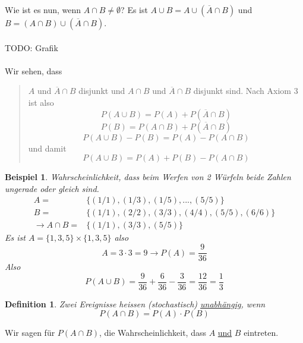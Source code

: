 \documentclass{report}
\newtheorem{mydef}{Definition}
\newtheorem{myexample}{Beispiel}
\begin{document}
Wie ist es nun, wenn $A \cap B \neq \emptyset$?
Es ist $A \cup B = A \cup (\overline{A} \cap B)$ und $B = (A \cap B) \cup (\overline{A} \cap B)$.
\\\\TODO: Grafik\\\\
Wir sehen, dass
\begin{quote}
$A$ und $\overline{A} \cap B$ disjunkt und $A \cap B$ und $\overline{A} \cap B$ disjunkt sind. Nach Axiom 3 ist also
\begin{equation}
P(A \cup B) = P(A) + P(\overline{A} \cap B)
\end{equation}
\begin{equation}
P(B) = P(A \cap B) + P(\overline{A} \cap B)
\end{equation}
\begin{equation}
P(A \cup B) - P(B) = P(A) - P(A \cap B)
\end{equation}
und damit
\begin{equation}
P(A \cup B) = P(A) + P(B) - P(A \cap B)
\end{equation}
\end{quote}
\begin{myexample}
Wahrscheinlichkeit, dass beim Werfen von 2 Würfeln beide Zahlen ungerade oder gleich sind.
\begin{align*}
 A =& \{(1/1),(1/3),(1/5), ..., (5/5)\} \\
 B =& \{(1/1),(2/2),(3/3),(4/4),(5/5),(6/6)\}\\
 \rightarrow A \cap B =& \{(1/1),(3/3),(5/5)\}
\end{align*}
Es ist $A = \{1,3,5\} \times \{1,3,5\}$ also
\begin{equation}
A = 3 \cdot 3 = 9 \longrightarrow P(A) = \frac{9}{36}
\end{equation}
Also
\begin{equation}
P(A \cup B) = \frac{9}{36} + \frac{6}{36} - \frac{3}{36} = \frac{12}{36} = \frac{1}{3}
\end{equation}
\end{myexample}
\begin{mydef}
Zwei Ereignisse heissen (stochastisch) \underline{unabhängig}, wenn
\begin{equation}
P(A \cap B) = P(A) \cdot P(B)
\end{equation}
\end{mydef}
Wir sagen für $P(A \cap B)$, die Wahrscheinlichkeit, dass $A$ \underline{und} $B$ eintreten.
\end{document}
